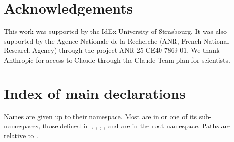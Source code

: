 \documentclass[11pt]{amsart}
\theoremstyle{plain}
\theoremstyle{definition}
\theoremstyle{remark}
\begin{document}
\section*{Acknowledgements}

This work was supported by the IdEx University of Strasbourg. It was also supported by the Agence Nationale de la Recherche (ANR, French National Research Agency) through the project ANR-25-CE40-7869-01. We thank Anthropic for access to Claude through the Claude Team plan for scientists.

\appendix
\section{Index of main declarations}\label{app:index}

Names are given up to their namespace. Most are in  or one of its sub-namespaces; those defined in , , , ,  and  are in the root namespace. Paths are relative to .
\end{document}
